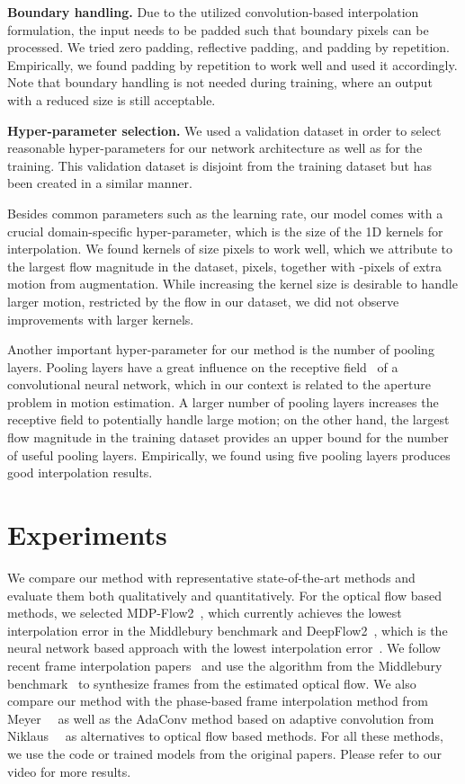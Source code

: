\documentclass[10pt,twocolumn,letterpaper]{article}
\begin{document}
\vspace{0.05in}
\noindent\textbf{Boundary handling.}
Due to the utilized convolution-based interpolation formulation, the input needs to be padded such that boundary pixels can be processed. We tried zero padding, reflective padding, and padding by repetition. Empirically, we found padding by repetition to work well and used it accordingly. Note that boundary handling is not needed during training, where an output with a reduced size is still acceptable.

\vspace{0.05in}
\noindent\textbf{Hyper-parameter selection.}
We used a validation dataset in order to select reasonable hyper-parameters for our network architecture as well as for the training. This validation dataset is disjoint from the training dataset but has been created in a similar manner.

Besides common parameters such as the learning rate, our model comes with a crucial domain-specific hyper-parameter, which is the size of the 1D kernels for interpolation. We found kernels of size  pixels to work well, which we attribute to the largest flow magnitude in the dataset,  pixels, together with -pixels of extra motion from augmentation. While increasing the kernel size is desirable to handle larger motion, restricted by the flow in our dataset, we did not observe improvements with larger kernels. 

Another important hyper-parameter for our method is the number of pooling layers. Pooling layers have a great influence on the receptive field~\cite{Luo_NIPS_2016} of a convolutional neural network, which in our context is related to the aperture problem in motion estimation. A larger number of pooling layers increases the receptive field to potentially handle large motion; on the other hand, the largest flow magnitude in the training dataset provides an upper bound for the number of useful pooling layers. Empirically, we found using five pooling layers produces good interpolation results. 
\section{Experiments}
\label{sec:exp}
We compare our method with representative state-of-the-art methods and evaluate them both qualitatively and quantitatively. For the optical flow based methods, we selected MDP-Flow2~\cite{Xu_PAMI_2012}, which currently achieves the lowest interpolation error in the Middlebury benchmark and DeepFlow2~\cite{Weinzaepfel_ICCV_2013}, which is the neural network based approach with the lowest interpolation error~\cite{Baker_OTHER_2011}. We follow recent frame interpolation papers~\cite{Liu_CORR_2017, Meyer_CVPR_2015} and use the algorithm from the Middlebury benchmark~\cite{Baker_OTHER_2011} to synthesize frames from the estimated optical flow. We also compare our method with the phase-based frame interpolation method from Meyer~\etal~\cite{Meyer_CVPR_2015} as well as the AdaConv method based on adaptive convolution from Niklaus~\etal~\cite{Niklaus_CVPR_2017} as alternatives to optical flow based methods. For all these methods, we use the code or trained models from the original papers. Please refer to our video for more results.
\end{document}
